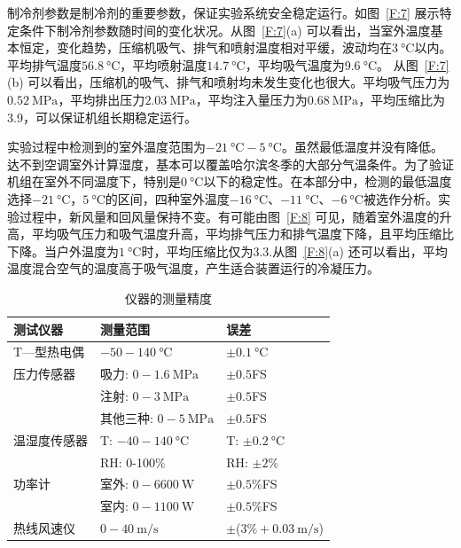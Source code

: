 制冷剂参数是制冷剂的重要参数，保证实验系统安全稳定运行。如图~\ref{F:7} 展示特定条件下制冷剂参数随时间的变化状况。从图~\ref{F:7}(a) 可以看出，当室外温度基本恒定，变化趋势，压缩机吸气、排气和喷射温度相对平缓，波动均在$\qty{3}{\degreeCelsius} $以内。平均排气温度$\qty{56.8}{\degreeCelsius} $，平均喷射温度$\qty{14.7}{\degreeCelsius} $，平均吸气温度为$\qty{9.6}{\degreeCelsius} $。
从图~\ref{F:7}(b) 可以看出，压缩机的吸气、排气和喷射均未发生变化也很大。平均吸气压力为$\qty{0.52}{\MPa} $，平均排出压力$\qty{2.03}{\MPa} $，平均注入量压力为$\qty{0.68}{\MPa} $，平均压缩比为3.9，可以保证机组长期稳定运行。

实验过程中检测到的室外温度范围为$\qty{-21}{\degreeCelsius} - \qty{5}{\degreeCelsius}  $。虽然最低温度并没有降低。达不到空调室外计算湿度，基本可以覆盖哈尔滨冬季的大部分气温条件。为了验证机组在室外不同温度下，特别是$\qty{0}{\degreeCelsius} $以下的稳定性。在本部分中，检测的最低温度选择$\qty{-21}{\degreeCelsius} $，$\qty{5}{\degreeCelsius} $的区间，四种室外温度$\qty{-16}{\degreeCelsius} $、$\qty{-11}{\degreeCelsius} $、$\qty{-6}{\degreeCelsius} $被选作分析。实验过程中，新风量和回风量保持不变。有可能由图~\ref{F:8} 可见，随着室外温度的升高，平均吸气压力和吸气温度升高，平均排气压力和排气温度下降，且平均压缩比下降。当户外温度为$\qty{1}{\degreeCelsius} $时，平均压缩比仅为3.3.从图~\ref{F:8}(a) 还可以看出，平均温度混合空气的温度高于吸气温度，产生适合装置运行的冷凝压力。

\begin{table}[ht]
	\centering
	\caption{仪器的测量精度}
	\begin{tabular}{@{}lll@{}}
		\toprule
		测试仪器 & 测量范围 & 误差 \\ \midrule
		T---型热电偶 & $-50-\qty{140}{\degreeCelsius}$ & $\pm \qty{0.1}{\degreeCelsius} $ \\ 
		压力传感器 & 吸力: $0-\qty{1.6}{\MPa} $ & $\pm 0.5$FS \\
			& 注射: $0-\qty{3}{\MPa} $ & $\pm 0.5$FS \\
			& 其他三种: $0-\qty{5}{\MPa} $ & $\pm 0.5$FS \\
		温湿度传感器 & T: $-40-\qty{140}{\degreeCelsius} $ & T: $\pm \qty{0.2}{\degreeCelsius} $ \\
					 & RH: 0-100\% & RH: $\pm 2\%$ \\ 
		功率计	& 室外: $0-\qty{6600}{\W} $ & $\pm 0.5\%$FS \\
				& 室内: $0-\qty{1100}{\W} $ & $\pm 0.5\%$FS \\
		热线风速仪 & $0-\qty{40}{\m/\s}$ & $\pm$($3\% + \qty{0.03}{\m/\s}$) \\ \bottomrule
	\end{tabular}
	\label{T:2}
\end{table}

